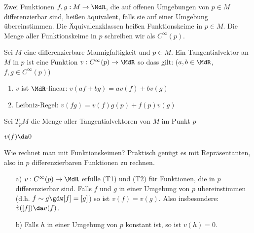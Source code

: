 \documentclass[a4paper,twoside,DIV15,BCOR12mm]{scrbook}
\begin{document}
\begin{definition}[Funktionskeim]
Zwei Funktionen $f,g:M \to \MdR$, die auf offenen Umgebungen von $p\in M$ differenzierbar sind, heißen äquivalent, falls sie auf einer Umgebung übereinstimmen. Die Äquivalenzklassen heißen Funktionskeime in $p\in M$. Die Menge aller Funktionskeime in $p$ schreiben wir als $C^\infty(p)$.
\end{definition}

\begin{definition}[Tangentialvektor]
Sei $M$ eine differenzierbare Mannigfaltigkeit und $p\in M$. Ein Tangentialvektor an $M$ in $p$ ist eine Funktion $v:C^\infty(p) \to \MdR$ so dass gilt: ($a,b\in\MdR$, $f,g\in C^\infty(p)$)
\begin{enumerate}[(T1)]
\item $v$ ist $\MdR$-linear: $v(af + bg) = a v(f) + b v(g)$
\item Leibniz-Regel: $v(fg) = v(f)g(p) + f(p)v(g)$ 
\end{enumerate}
Sei $T_pM$ die Menge aller Tangentialvektoren von $M$ im Punkt $p$
\end{definition}

\begin{beispiel}
$v(f) \da 0$
\end{beispiel}

Wie rechnet man mit Funktionskeimen? Praktisch genügt es mit Repräsentanten, also in $p$ differenzierbaren Funktionen zu rechnen.

\begin{lemma}
\begin{itemize}
\item[a)]
$v:C^\infty(p) \to \MdR$ erfülle (T1) und (T2) für Funktionen, die in $p$ differenzierbar sind. Falls $f$ und $g$ in einer Umgebung von $p$ übereinstimmen (d.h. $f\sim g \gdw [f] = [g]$) so ist $v(f) = v(g)$. Also insbesondere: $\tilde v([f]) \da v(f)$.
\item[b)]
Falls $h$ in einer Umgebung von $p$ konstant ist, so ist $v(h)=0$.
\end{itemize}
\end{lemma}
\end{document}
